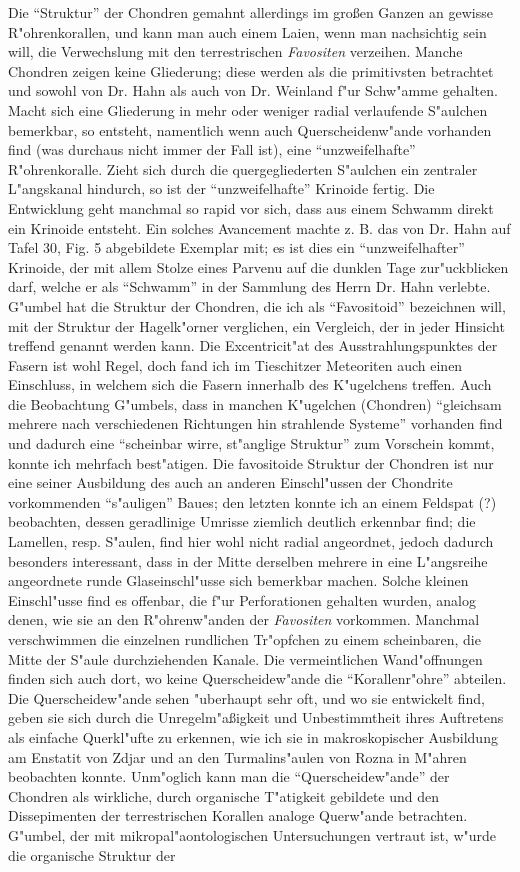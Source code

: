 \documentclass[a4paper, 12pt, oneside]{article}
\begin{document}
Die "`Struktur"' der Chondren gemahnt allerdings im großen Ganzen an gewisse R"ohrenkorallen, und kann man auch einem Laien, wenn man nachsichtig sein will, die Verwechslung mit den terrestrischen \emph{Favositen} verzeihen. Manche Chondren zeigen keine Gliederung; diese werden als die primitivsten betrachtet und sowohl von Dr. Hahn als auch von Dr. Weinland f"ur Schw"amme gehalten. Macht sich eine Gliederung in mehr oder weniger radial verlaufende S"aulchen bemerkbar, so entsteht, namentlich wenn auch Querscheidenw"ande vorhanden find (was durchaus nicht immer der Fall ist), eine "`unzweifelhafte"' R"ohrenkoralle. Zieht sich durch die quergegliederten S"aulchen ein zentraler L"angskanal hindurch, so ist der "`unzweifelhafte"' Krinoide fertig. Die Entwicklung geht manchmal so rapid vor sich, dass aus einem Schwamm direkt ein Krinoide entsteht. Ein solches Avancement machte z. B. das von Dr. Hahn auf Tafel 30, Fig. 5 abgebildete Exemplar mit; es ist dies ein "`unzweifelhafter"' Krinoide, der mit allem Stolze eines Parvenu auf die dunklen Tage zur"uckblicken darf, welche er als "`Schwamm"' in der Sammlung des Herrn Dr. Hahn verlebte. G"umbel hat die Struktur der Chondren, die ich als "`Favositoid"' bezeichnen will, mit der Struktur der Hagelk"orner verglichen, ein Vergleich, der in jeder Hinsicht treffend genannt werden kann. Die Excentricit"at des Ausstrahlungspunktes der Fasern ist wohl Regel, doch fand ich im Tieschitzer Meteoriten auch einen Einschluss, in welchem sich die Fasern innerhalb des K"ugelchens treffen. Auch die Beobachtung G"umbels, dass in manchen K"ugelchen (Chondren) "`gleichsam mehrere nach verschiedenen Richtungen hin strahlende Systeme"' vorhanden find und dadurch eine "`scheinbar wirre, st"anglige Struktur"' zum Vorschein kommt, konnte ich mehrfach best"atigen. Die favositoide Struktur der Chondren ist nur eine seiner Ausbildung des auch an anderen Einschl"ussen der Chondrite vorkommenden "`s"auligen"' Baues; den letzten konnte ich an einem Feldspat (?) beobachten, dessen geradlinige Umrisse ziemlich deutlich erkennbar find; die Lamellen, resp. S"aulen, find hier wohl nicht radial angeordnet, jedoch dadurch besonders interessant, dass in der Mitte derselben mehrere in eine L"angsreihe angeordnete runde Glaseinschl"usse sich bemerkbar machen. Solche kleinen Einschl"usse find es offenbar, die f"ur Perforationen gehalten wurden, analog denen, wie sie an den R"ohrenw"anden der \emph{Favositen} vorkommen. Manchmal verschwimmen die einzelnen rundlichen Tr"opfchen zu einem scheinbaren, die Mitte der S"aule durchziehenden Kanale. Die vermeintlichen Wand"offnungen finden sich auch dort, wo keine Querscheidew"ande die "`Korallenr"ohre"' abteilen. Die Querscheidew"ande sehen "uberhaupt sehr oft, und wo sie entwickelt find, geben sie sich durch die Unregelm"aßigkeit und Unbestimmtheit ihres Auftretens als einfache Querkl"ufte zu erkennen, wie ich sie in makroskopischer Ausbildung am Enstatit von Zdjar und an den Turmalins"aulen von Rozna in M"ahren beobachten konnte. Unm"oglich kann man die "`Querscheidew"ande"' der Chondren als wirkliche, durch organische T"atigkeit gebildete und den Dissepimenten der terrestrischen Korallen analoge Querw"ande betrachten. G"umbel, der mit mikropal"aontologischen Untersuchungen vertraut ist, w"urde die organische Struktur der 
\end{document}
